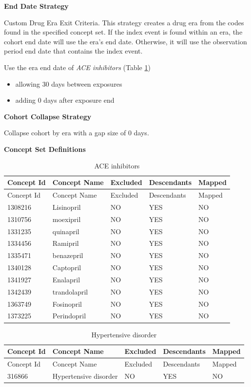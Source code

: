 \documentclass[]{book}
\providecommand{\tightlist}{%
  \setlength{\itemsep}{0pt}\setlength{\parskip}{0pt}}
\begin{document}
\textbf{End Date Strategy}

Custom Drug Era Exit Criteria. This strategy creates a drug era from the
codes found in the specified concept set. If the index event is found
within an era, the cohort end date will use the era's end date.
Otherwise, it will use the observation period end date that contains the
index event.

Use the era end date of \emph{ACE inhibitors} (Table
\ref{tab:aceInhibitorsMono})

\begin{itemize}
\tightlist
\item
  allowing 30 days between exposures
\item
  adding 0 days after exposure end
\end{itemize}

\textbf{Cohort Collapse Strategy}

Collapse cohort by era with a gap size of 0 days.

\textbf{Concept Set Definitions}

\begin{longtable}[]{@{}lllll@{}}
\caption{\label{tab:aceInhibitorsMono} ACE inhibitors}\tabularnewline
\toprule
Concept Id & Concept Name & Excluded & Descendants &
Mapped\tabularnewline
\midrule
\endfirsthead
\toprule
Concept Id & Concept Name & Excluded & Descendants &
Mapped\tabularnewline
\midrule
\endhead
1308216 & Lisinopril & NO & YES & NO\tabularnewline
1310756 & moexipril & NO & YES & NO\tabularnewline
1331235 & quinapril & NO & YES & NO\tabularnewline
1334456 & Ramipril & NO & YES & NO\tabularnewline
1335471 & benazepril & NO & YES & NO\tabularnewline
1340128 & Captopril & NO & YES & NO\tabularnewline
1341927 & Enalapril & NO & YES & NO\tabularnewline
1342439 & trandolapril & NO & YES & NO\tabularnewline
1363749 & Fosinopril & NO & YES & NO\tabularnewline
1373225 & Perindopril & NO & YES & NO\tabularnewline
\bottomrule
\end{longtable}

\begin{longtable}[]{@{}lllll@{}}
\caption{\label{tab:hypertensionAceMono} Hypertensive
disorder}\tabularnewline
\toprule
Concept Id & Concept Name & Excluded & Descendants &
Mapped\tabularnewline
\midrule
\endfirsthead
\toprule
Concept Id & Concept Name & Excluded & Descendants &
Mapped\tabularnewline
\midrule
\endhead
316866 & Hypertensive disorder & NO & YES & NO\tabularnewline
\bottomrule
\end{longtable}
\end{document}
